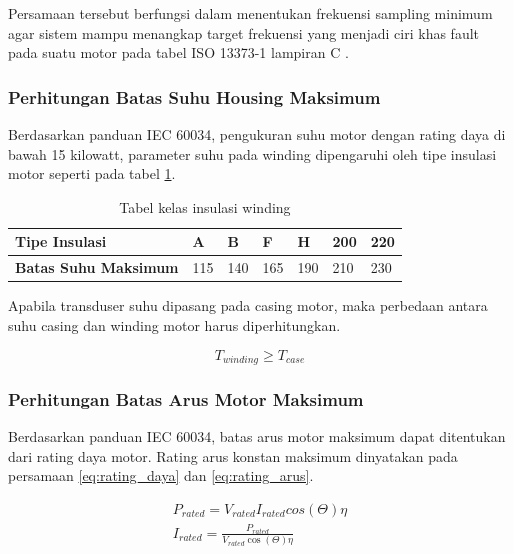 \documentclass{elsinta}
\begin{document}
    Persamaan tersebut berfungsi dalam menentukan
    frekuensi sampling minimum agar sistem
    mampu menangkap target frekuensi yang menjadi
    ciri khas fault pada suatu motor pada tabel
    ISO 13373-1 lampiran C \cite{2.1.4}.

\subsubsection{Perhitungan Batas Suhu Housing Maksimum}
    Berdasarkan panduan IEC 60034, pengukuran suhu motor dengan
    rating daya di bawah 15 kilowatt,
    parameter suhu pada winding dipengaruhi
    oleh tipe insulasi motor seperti pada tabel 
    \ref{tab:insulation_class}\cite{iec60034_2022}.
    
    \begin{table}[H]
    \centering
    \caption{Tabel kelas insulasi winding\cite{3.1.5}}
    \label{tab:insulation_class}
    \begin{tabular}{|p{3cm}|p{1.5cm}|p{1.5cm}|p{1.5cm}|p{1.5cm}|p{1.5cm}|p{1.5cm}|}
        \hline
        \textbf{Tipe Insulasi} &\textbf{A} & \textbf{B} & \textbf{F} & \textbf{H} & \textbf{200} & \textbf{220}\\
        \hline
        \textbf{Batas Suhu Maksimum} & 115 & 140 & 165 & 190 & 210 & 230 \\
        \hline
    \end{tabular}
    \end{table}

    Apabila transduser suhu dipasang pada
    casing motor, maka perbedaan antara suhu casing
    dan winding motor harus diperhitungkan.

    \[T_{winding} \geq T_{case}\]

\subsubsection{Perhitungan Batas Arus Motor Maksimum}
    Berdasarkan panduan IEC 60034, batas arus motor maksimum
    dapat ditentukan dari rating daya motor. Rating
    arus konstan maksimum dinyatakan pada persamaan
    \ref{eq:rating_daya} dan \ref{eq:rating_arus}.

    \begin{align}
        \label{eq:rating_daya}
        P_{rated}=V_{rated} I_{rated} cos(\Theta) \eta\\ 
        \label{eq:rating_arus}
        I_{rated}=\frac{P_{rated}}{V_{rated} \cos(\Theta) \eta}
    \end{align}
\end{document}

